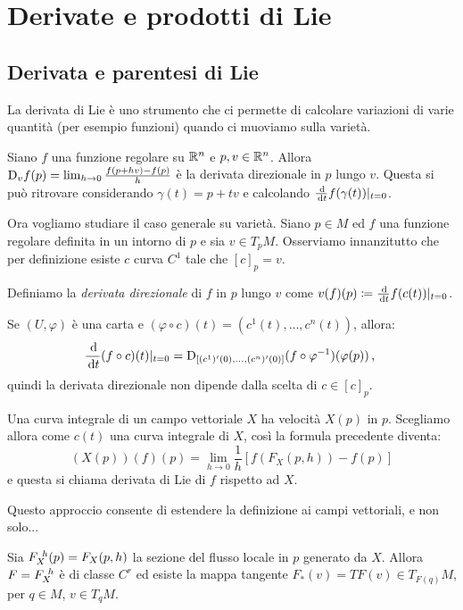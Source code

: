 \chapter{Derivate e prodotti di Lie}

\section{Derivata e parentesi di Lie}
La derivata di Lie è uno strumento che ci permette di calcolare variazioni di varie quantità (per esempio funzioni) quando ci muoviamo sulla varietà.

Siano $f$ una funzione regolare su $\mathbb R^n$ e $p,v\in\mathbb R^n$. Allora $\mathrm D_vf(p)=\lim_{h\to 0} \frac{f(p+hv)-f(p)}h$ è la derivata direzionale in $p$ lungo $v$. Questa si può ritrovare considerando $\gamma(t)=p+tv$ e calcolando $\frac {\,\mathrm d}{\,\mathrm d t} f(\gamma(t))|_{t=0}$.

Ora vogliamo studiare il caso generale su varietà.
Siano $p\in M$ ed $f$ una funzione regolare definita in un intorno di $p$ e sia $v \in T_{p}M$. Osserviamo innanzitutto che per definizione esiste $c$ curva $C^1$ tale che $[c]_p=v$.

\begin{definition} 
	Definiamo la \emph{derivata direzionale} di $f$ in $p$ lungo $v$ come $v(f)(p)\coloneqq\frac {\,\mathrm d} {\,\mathrm d t} f(c(t))|_{t=0}$.
\end{definition}

Se $(U,\varphi)$ è una carta e $(\varphi\circ c)(t)=(c^1(t),\ldots,c^n(t))$, allora:
\begin{equation*}
	\frac {\,\mathrm d}{\,\mathrm d t} (f\circ c)(t)|_{t=0}=\mathrm D_{[(c^1)'(0),\ldots,(c^n)'(0)]}(f\circ\varphi^{-1})(\varphi(p)) \, \text{, }
\end{equation*}
quindi la derivata direzionale non dipende dalla scelta di $c\in[c]_p$.

Una curva integrale di un campo vettoriale $X$ ha velocità $X(p)$ in $p$. Scegliamo allora come $c(t)$ una curva integrale di $X$, così la formula precedente diventa:
\begin{equation*}
	(X(p))(f)(p)=\lim_{h\to 0} \frac 1h \left[ f(F_X(p,h))-f(p) \right]
\end{equation*}
e questa si chiama derivata di Lie di $f$ rispetto ad $X$.

Questo approccio consente di estendere la definizione ai campi vettoriali, e non solo...

Sia $F_{X}^{\ h}(p)=F_X(p,h)$ la sezione del flusso locale in $p$ generato da $X$. Allora $F=F_{X}^{\ h}$ è di classe $C^r$ ed esiste la mappa tangente $F_*(v)=TF(v)\in T_{F(q)}M$, per $q\in M$, $v\in T_qM$.

